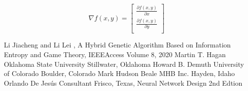 \documentclass[conference]{IEEEtran}
\begin{document}
\begin{equation}
\label{gradient_descent}
\nabla f(x, y) = \left[
\begin{array}{ccc}
\frac{\partial f(x, y)}{\partial x}\\
\frac{\partial f(x, y)}{\partial y}\\
\end{array}
\right]
\end{equation}

\begin{thebibliography}{00}
 Li Jiacheng and Li Lei
, A Hybrid Genetic Algorithm Based on Information Entropy and Game Theory, IEEEAccess Volume 8, 2020
 Martin T. Hagan Oklahoma State University Stillwater, Oklahoma Howard B. Demuth University of Colorado Boulder, Colorado Mark Hudson Beale MHB Inc. Hayden, Idaho Orlando De Jesús Consultant Frisco, Texas, Neural Network Design 2nd Edtion 

\end{thebibliography}
\vspace{12pt}
\end{document}
